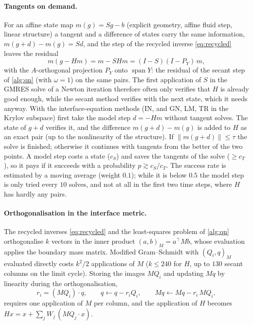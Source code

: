 \documentclass[11pt,a4paper]{article}
\theoremstyle{definition}
\theoremstyle{remark}
\newcommand{\M}{M}
\begin{document}
\paragraph{Tangents on demand.} For an affine state map $m(g)=Sg-b$ (explicit geometry, affine
fluid step, linear structure) a tangent and a difference of states carry the same information,
$m(g+d)-m(g)=Sd$, and the step of the recycled inverse \eqref{eq:recycled} leaves the residual
\begin{equation}\label{eq:model_step}
  m(g-Hm)=m-SHm=(I-S)(I-P_Y)\,m,
\end{equation}
with the $A$-orthogonal projection $P_Y$ onto $\operatorname{span}Y$: the residual of the secant
step of \cref{alg:qn} (with $\omega=1$) on the same pairs. The first application of $S$ in the
GMRES solve of a Newton iteration therefore often only verifies that $H$ is already good enough,
while the secant method verifies with the next state, which it needs anyway. With
 the interface-equation methods (IN, and GN, LM, TR in the Krylov subspace)
first take the model step $d=-Hm$ without tangent solves. The state of $g+d$ verifies it, and the
difference $m(g+d)-m(g)$ is added to $H$ as an exact pair (up to the nonlinearity of the
structure). If $\|m(g+d)\|\le\tau$ the solve is finished; otherwise it continues with tangents from
the better of the two points. A model step costs a state ($c_S$) and saves the tangents of the solve
($\ge c_T$), so it pays if it succeeds with a probability $p\gtrsim c_S/c_T$. The success rate is
estimated by a moving average (weight $0.1$); while it is below $0.5$ the model step is only tried
every $10$ solves, and not at all in the first two time steps, where $H$ has hardly any pairs.

\paragraph{Orthogonalisation in the interface metric.} The recycled inverses \eqref{eq:recycled} and
the least-squares problem of \cref{alg:qn} orthogonalise $k$ vectors in the inner product
$(a,b)_{\M}=a^{\top}\M b$, whose evaluation applies the boundary mass matrix. Modified Gram--Schmidt
with $(Q_i,q)_{\M}$ evaluated directly costs $k^2/2$ applications of $\M$ ($k\le240$ for $H$, up to
$130$ secant columns on the limit cycle). Storing the images $\M Q_i$ and updating $\M q$ by
linearity during the orthogonalisation,
\begin{equation}\label{eq:metric_images}
  r_i=(\M Q_i)\cdot q,\qquad q\leftarrow q-r_iQ_i,\qquad \M q\leftarrow\M q-r_i\,\M Q_i,
\end{equation}
requires one application of $\M$ per column, and the application of $H$ becomes
$Hx=x+\sum_jW_j\,(\M Q_j\cdot x)$.
\end{document}
